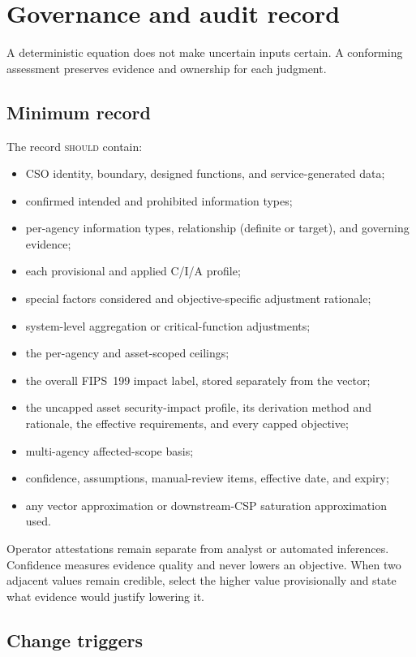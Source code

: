 \documentclass[11pt]{article}
\newcommand{\rfckw}[1]{\textsc{#1}}
\begin{document}
\section{Governance and audit record}

A deterministic equation does not make uncertain inputs certain. A conforming
assessment preserves evidence and ownership for each judgment.

\subsection{Minimum record}

The record \rfckw{should} contain:

\begin{itemize}[leftmargin=1.5em]
\item CSO identity, boundary, designed functions, and service-generated data;
\item confirmed intended and prohibited information types;
\item per-agency information types, relationship (definite or target), and
  governing evidence;
\item each provisional and applied C/I/A profile;
\item special factors considered and objective-specific adjustment rationale;
\item system-level aggregation or critical-function adjustments;
\item the per-agency and asset-scoped ceilings;
\item the overall FIPS~199 impact label, stored separately from the vector;
\item the uncapped asset security-impact profile, its derivation method and
  rationale, the effective requirements, and every capped objective;
\item multi-agency affected-scope basis;
\item confidence, assumptions, manual-review items, effective date, and expiry;
\item any vector approximation or downstream-CSP saturation approximation used.
\end{itemize}

Operator attestations remain separate from analyst or automated inferences.
Confidence measures evidence quality and never lowers an objective. When two
adjacent values remain credible, select the higher value provisionally and state
what evidence would justify lowering it.

\subsection{Change triggers}
\end{document}
